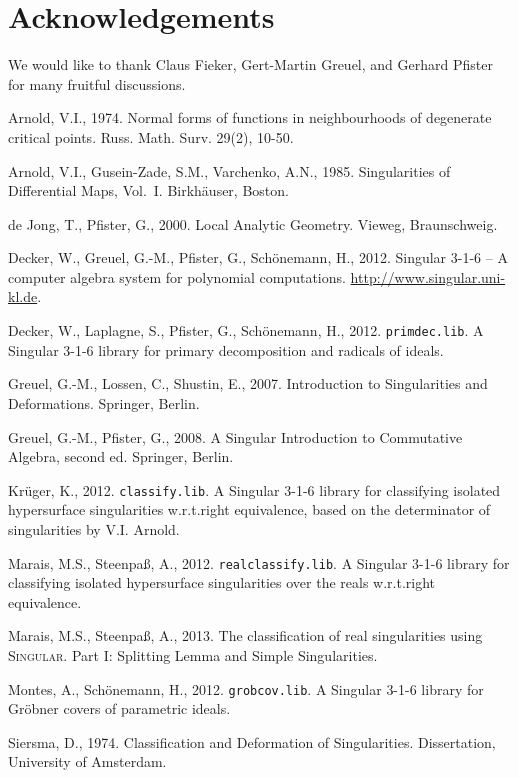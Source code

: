 \documentclass[noend]{amsproc}
\theoremstyle{definition}
\newcommand{\Singular}{\textsc{Singular}}
\begin{document}
\section{Acknowledgements}

We would like to thank Claus Fieker, Gert-Martin Greuel, and Gerhard Pfister
for many fruitful discussions.


\clearpage

\begin{thebibliography}{99}

Arnold, V.I., 1974.
Normal forms of functions in neighbourhoods of degenerate critical points.
Russ. Math. Surv. 29(2), 10-50.

Arnold, V.I., Gusein-Zade, S.M., Varchenko, A.N., 1985.
Singularities of Differential Maps, Vol.~I.
Birkh\"auser, Boston.

de Jong, T., Pfister, G., 2000.
Local Analytic Geometry.
Vieweg, Braunschweig.

Decker, W., Greuel, G.-M., Pfister, G., Sch{\"o}nemann, H., 2012.
{\sc Singular} {3-1-6} -- {A} computer algebra system for polynomial
computations.
\url{http://www.singular.uni-kl.de}.

Decker, W., Laplagne, S., Pfister, G., Sch\"onemann, H., 2012.
{\tt primdec.lib}. {A} {\sc Singular} {3-1-6} library for primary decomposition
and radicals of ideals.

Greuel, G.-M., Lossen, C., Shustin, E., 2007.
Introduction to Singularities and Deformations.
Springer, Berlin.

Greuel, G.-M., Pfister, G., 2008.
A Singular Introduction to Commutative Algebra, second ed.
Springer, Berlin.

Kr\"uger, K., 2012.
{\tt classify.lib}. {A} {\sc Singular} {3-1-6} library for classifying isolated
hypersurface singularities w.r.t.\@ right equivalence, based on the
determinator of singularities by V.I. Arnold.

Marais, M.S., Steenpa\ss, A., 2012.
{\tt realclassify.lib}. {A} {\sc Singular} {3-1-6} library for classifying
isolated hypersurface singularities over the reals w.r.t.\@ right equivalence.

Marais, M.S., Steenpa\ss, A., 2013.
The classification of real singularities using \Singular{}. Part I: Splitting
Lemma and Simple Singularities.

Montes, A., Sch\"onemann, H., 2012.
{\tt grobcov.lib}. {A} {\sc Singular} {3-1-6} library for Gr\"obner covers of
parametric ideals.

Siersma, D., 1974.
Classification and Deformation of Singularities.
Dissertation, University of Amsterdam.

\end{thebibliography}
\end{document}
